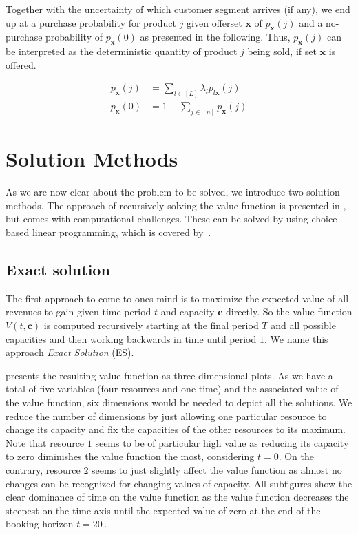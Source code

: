 Together with the uncertainty of which customer segment arrives (if any), we end up at a purchase probability for product $j$ given offerset $\boldsymbol{x}$ of $p_{\boldsymbol{x}}(j)$ and a no-purchase probability of $p_{\boldsymbol{x}}(0)$ as presented in the following. Thus, $p_{\boldsymbol{x}}(j)$ can be interpreted as the deterministic quantity of product $j$ being sold, if set $\boldsymbol{x}$ is offered.

\begin{align}
	p_{\boldsymbol{x}}(j) &= \sum_{l \in [L]} \lambda_l p_{l\boldsymbol{x}}(j)\\
	p_{\boldsymbol{x}}(0) &= 1-\sum_{j\in[n]}p_{\boldsymbol{x}}(j)
\end{align}
 

\section{Solution Methods}\label{s:Metho}

As we are now clear about the problem to be solved, we introduce two solution methods. The approach of recursively solving the value function is presented in , but comes with computational challenges. These can be solved by using choice based linear programming, which is covered by \,.


\subsection{Exact solution}\label{ss:es}

The first approach to come to ones mind is to maximize the expected value of all revenues to gain given time period $t$ and capacity $\boldsymbol{c}$ directly. So the value function $V(t, \boldsymbol{c})$ is computed recursively starting at the final period $T$ and all possible capacities and then working backwards in time until period $1$. We name this approach \emph{Exact Solution} (ES).

 presents the resulting value function as three dimensional plots. As we have a total of five variables (four resources and one time) and the associated value of the value function, six dimensions would be needed to depict all the solutions. We reduce the number of dimensions by just allowing one particular resource to change its capacity and fix the capacities of the other resources to its maximum. Note that resource $1$ seems to be of particular high value as reducing its capacity to zero diminishes the value function the most, \eg considering $t=0$. On the contrary, resource $2$ seems to just slightly affect the value function as almost no changes can be recognized for changing values of capacity. All subfigures show the clear dominance of time on the value function as the value function decreases the steepest on the time axis until the expected value of zero at the end of the booking horizon $t=20$\,.

